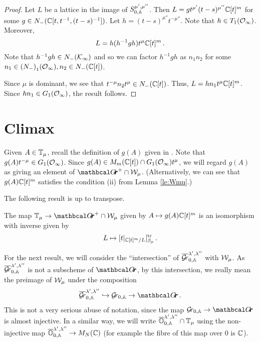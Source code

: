 \documentclass[draft]{article}
\begin{document}
\begin{proof}
    Let $ L $ 
    be a lattice in the image of $S^{\mu',\mu''}_{0,\AA}$. Then $ L = g t^{\mu'} (t-s)^{\mu''}\CC[t]^m$ for some $ g \in N_-(\CC[t, t^{-1}, (t-s)^{-1}]) $.  Let $ h =(t-s)^{\mu''} t^{-\mu''}  $.  Note that $ h \in T_1(\Oinf)$. 
    Moreover,
    $$ L = h (h^{-1} g h) t^{\mu}\CC[t]^m\,. $$
    Note that 
    $h^{-1} g h \in N_-(\cK_\infty)$ and so we can factor $ h^{-1} g h$ as $n_1 n_2$ for some $ n_1 \in {(N_-)}_1(\Oinf), n_2 \in {N_-}(\CC[t]) $. 
    
    Since $ \mu $ is dominant, we see that $ t^{-\mu} n_2 t^\mu \in N_-(\CC[t]) $. %
    Thus, $ L = h n_1 t^\mu \CC[t]^m$.  Since $ hn_1 \in G_1(\Oinf)$, the result follows. %
\end{proof}
% 
\section{Climax}
\label{s:climax}
Given $ A \in \TT_\mu$, recall the definition of $ g(A)$ given in .  Note that $g(A)t^{-\mu} \in G_1(\Oinf)$.
Since $ g(A) \in M_m(\CC[t]) \cap G_1(\Oinf)t^\mu$, we will regard $ g(A)$ as giving an element of $ \Grth^+ \cap \cW_\mu$.  (Alternatively, we can see that $ g(A) \CC[t]^m$ satisfies the condition (ii) from Lemma \ref{le:Wmu}.)

The following result is \cite[Theorem 3.2]{cautis2018categorical} up to transpose.
% 
\begin{theorem} 
\label{th:TmuWmu}
The map $ \TT_\mu \rightarrow \Grth^+ \cap \cW_\mu $ given by $ A \mapsto g(A)\CC[t]^m $ is an isomorphism with inverse given by
$$ L \mapsto [t|_{\CC[t]^m/L} ]^{\tr}_{\beta_\mu} \,. $$
\end{theorem}
% 

For the next result, we will consider the ``intersection'' of $ \overline{\Gr}^{\lambda', \lambda''}_{0,\AA} $ with $\cW_\mu$.  
As $  \overline{\Gr}^{\lambda', \lambda''}_{0,\AA} $ is not a subscheme of $ \Grth$, by this intersection, we really mean the preimage of $ \cW_\mu$ under the composition
$$ 
    \overline{\Gr}^{\lambda', \lambda''}_{0,\AA}  \hookrightarrow \Grbd \rightarrow \Grth\,.
$$
This is not a very serious abuse of notation, since the map $ \Grbd \rightarrow \Grth $ is almost injective. 
In a similar way, we will write $ \overline{\OO}^{\lambda', \lambda''}_{0,\AA} \cap \TT_\mu$ using the non-injective map $ \overline{\OO}^{\lambda', \lambda''}_{0,\AA} \rightarrow M_N(\CC)$ (for example the fibre of this map over $ 0 $ is $ \CC $). 
\end{document}
